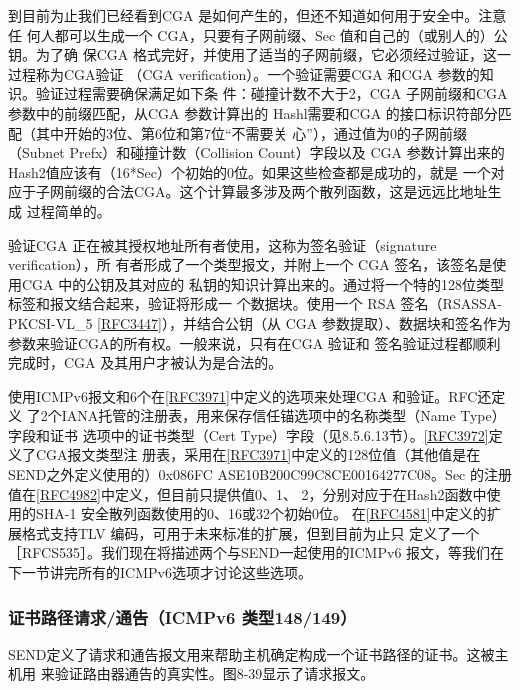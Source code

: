 到目前为止我们已经看到CGA 是如何产生的，但还不知道如何用于安全中。注意任
何人都可以生成一个 CGA，只要有子网前缀、Sec 值和自己的（或别人的）公钥。为了确
保CGA 格式完好，并使用了适当的子网前缀，它必须经过验证，这一过程称为CGA验证
（CGA verification）。一个验证需要CGA 和CGA 参数的知识。验证过程需要确保满足如下条
件：碰撞计数不大于2，CGA 子网前缀和CGA 参数中的前缀匹配，从CGA 参数计算出的
Hashl需要和CGA 的接口标识符部分匹配（其中开始的3位、第6位和第7位“不需要关
心”），通过值为0的子网前缀（Subnet Prefx）和碰撞计数（Collision Count）字段以及 CGA
参数计算出来的 Hash2值应该有（16*Sec）个初始的0位。如果这些检查都是成功的，就是
一个对应于子网前缀的合法CGA。这个计算最多涉及两个散列函数，这是远远比地址生成
过程简单的。

验证CGA 正在被其授权地址所有者使用，这称为签名验证（signature verification），所
有者形成了一个类型报文，并附上一个 CGA 签名，该签名是使用CGA 中的公钥及其对应的
私钥的知识计算出来的。通过将一个特的128位类型标签和报文结合起来，验证将形成一
个数据块。使用一个 RSA 签名（RSASSA-PKCSI-VL\_5 \href{https://www.rfc-editor.org/rfc/rfc3447}{[RFC3447]}），并结合公钥（从 CGA
参数提取）、数据块和签名作为参数来验证CGA的所有权。一般来说，只有在CGA 验证和
签名验证过程都顺利完成时，CGA 及其用户才被认为是合法的。

使用ICMPv6报文和6个在\href{https://www.rfc-editor.org/rfc/rfc3971}{[RFC3971]}中定义的选项来处理CGA 和验证。RFC还定义
了2个IANA托管的注册表，用来保存信任锚选项中的名称类型（Name Type）字段和证书
选项中的证书类型（Cert Type）字段（见8.5.6.13节）。\href{https://www.rfc-editor.org/rfc/rfc3972}{[RFC3972]}定义了CGA报文类型注
册表，采用在\href{https://www.rfc-editor.org/rfc/rfc3971}{[RFC3971]}中定义的128位值（其他值是在SEND之外定义使用的）0x086FC
ASE10B200C99C8CE00164277C08。Sec 的注册值在\href{https://www.rfc-editor.org/rfc/rfc4982}{[RFC4982]}中定义，但目前只提供值0、1、
2，分别对应于在Hash2函数中使用的SHA-1 安全散列函数使用的0、16或32个初始0位。
在\href{https://www.rfc-editor.org/rfc/rfc4581}{[RFC4581]}中定义的扩展格式支持TLV 编码，可用于未来标准的扩展，但到目前为止只
定义了一个［RFCS535］。我们现在将描述两个与SEND一起使用的ICMPv6 报文，等我们在
下一节讲完所有的ICMPv6选项才讨论这些选项。

\subsubsection{证书路径请求/通告（ICMPv6 类型148/149）}
SEND定义了请求和通告报文用来帮助主机确定构成一个证书路径的证书。这被主机用
来验证路由器通告的真实性。图8-39显示了请求报文。

